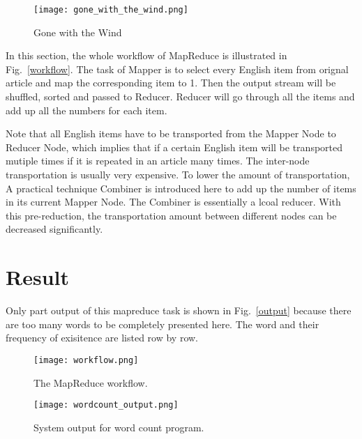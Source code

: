 \documentclass[10pt,twocolumn,letterpaper]{article}
\begin{document}
    \begin{figure}[t]
        \begin{center}
           \texttt{[image: gone\_with\_the\_wind.png]}
        \end{center}
           \caption{Gone with the Wind}
        \label{gone_with_the_wind}
        \label{fig:long}
        \label{fig:onecol}
    \end{figure}
    In this section, the whole workflow of MapReduce is illustrated in Fig.~\ref{workflow}. 
    The task of Mapper is to select every English item from orignal article and map
    the corresponding item to 1. Then the output stream will be
    shuffled, sorted and passed to Reducer. Reducer will go through all
    the items and add up all the numbers for each item. 

    Note that all English items have to be transported from the Mapper Node to Reducer Node,
    which implies that if a certain English item will be transported mutiple times if it is 
    repeated in an article many times. 
    The inter-node transportation is usually very
    expensive. To lower the amount of transportation, A practical technique Combiner is introduced
    here to add up the number of items in its current Mapper Node.
    The Combiner is essentially a lcoal reducer. With this pre-reduction, 
    the transportation amount between different nodes can be decreased significantly.
    
    \section{Result}
    
    Only part output of this mapreduce task is shown in Fig.~\ref{output} because there are too 
    many words to be completely presented here. The word and their frequency of exisitence are
    listed row by row. 
    \begin{figure}[t]
        \begin{center}
           \texttt{[image: workflow.png]}
        \end{center}
           \caption{\label{workflow}The MapReduce workflow.}
        \label{fig:long}
        \label{fig:onecol}
    \end{figure}

    \begin{figure}[t]
        \begin{center}
           \texttt{[image: wordcount\_output.png]}
        \end{center}
           \caption{System output for word count program.}
        \label{output}
        \label{fig:long}
        \label{fig:onecol}
    \end{figure}
    
\end{document}
